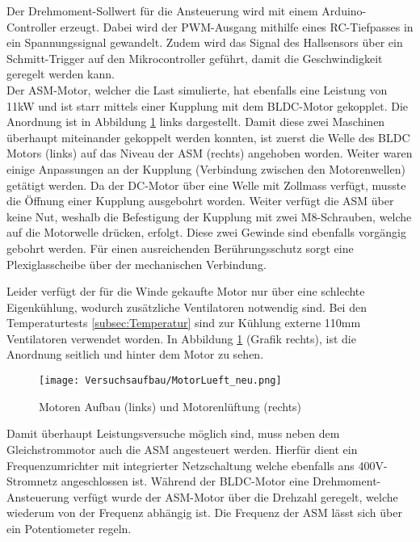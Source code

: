 Der Drehmoment-Sollwert für die Ansteuerung wird mit einem Arduino-Controller erzeugt. Dabei wird der PWM-Ausgang mithilfe eines RC-Tiefpasses in ein Spannungssignal gewandelt. Zudem wird das Signal des Hallsensors über ein Schmitt-Trigger auf den Mikrocontroller geführt, damit die Geschwindigkeit geregelt werden kann.\\
Der ASM-Motor, welcher die Last simulierte, hat ebenfalls eine Leistung von 11kW und ist starr mittels einer Kupplung mit dem BLDC-Motor gekopplet. Die Anordnung ist in Abbildung \ref{fig:MotorenLueftung} links dargestellt. Damit diese zwei Maschinen überhaupt miteinander gekoppelt werden konnten, ist zuerst die Welle des BLDC Motors (links) auf das Niveau der ASM (rechts) angehoben worden. Weiter waren einige Anpassungen an der Kupplung (Verbindung zwischen den Motorenwellen) getätigt werden. Da der DC-Motor über eine Welle mit Zollmass verfügt, musste die Öffnung einer Kupplung ausgebohrt worden. Weiter verfügt die ASM über keine Nut, weshalb die Befestigung der Kupplung mit zwei M8-Schrauben, welche auf die Motorwelle drücken, erfolgt. Diese zwei Gewinde sind ebenfalls vorgängig gebohrt werden. Für einen ausreichenden Berührungsschutz sorgt eine Plexiglasscheibe über der mechanischen Verbindung.


Leider verfügt der für die Winde gekaufte Motor nur über eine schlechte Eigenkühlung, wodurch zusätzliche Ventilatoren notwendig sind. Bei den Temperaturtests \ref{subsec:Temperatur} sind zur Kühlung externe 110mm Ventilatoren verwendet worden. In Abbildung \ref{fig:MotorenLueftung} (Grafik rechts), ist die Anordnung seitlich und hinter dem Motor zu sehen.
\begin{figure}[H]
	\begin{center}
		\texttt{[image: Versuchsaufbau/MotorLueft\_neu.png]}
		\caption[Motoren Aufbau und Motorenlüftung]{Motoren Aufbau (links) und Motorenlüftung (rechts)}
		\label{fig:MotorenLueftung}
	\end{center}
\end{figure}

Damit überhaupt Leistungsversuche möglich sind, muss neben dem Gleichstrommotor auch die ASM angesteuert werden. Hierfür dient ein Frequenzumrichter mit integrierter Netzschaltung welche ebenfalls ans 400V-Stromnetz angeschlossen ist. Während der BLDC-Motor eine Drehmoment-Ansteuerung verfügt wurde der ASM-Motor über die Drehzahl geregelt, welche wiederum von der Frequenz abhängig ist. Die Frequenz der ASM lässt sich über ein Potentiometer regeln.